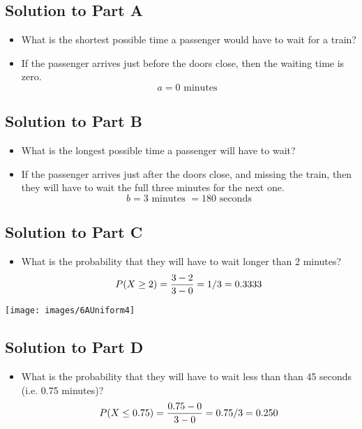 \documentclass[a4paper,12pt]{article}
\begin{document}
{
\subsection*{Solution to Part A}

\begin{itemize}
\item What is the shortest possible time a passenger would have to wait for a train?
\item If the passenger arrives just before the doors close, then the waiting time is zero.
\[ a = 0 \mbox{ minutes } \]
\end{itemize}
\subsection*{Solution to Part B}
\begin{itemize}
\item What is the longest possible time a passenger will have to wait?
\item If the passenger arrives just after the doors close, and missing the train, then they will have to wait the full three minutes for the next one.
\[ b = 3 \mbox{ minutes }  = 180 \mbox{ seconds}  \]
\end{itemize}
\subsection*{Solution to Part C}



\begin{itemize}
\item What is the probability that they will have to wait longer than 2 minutes?
\[ P(X \geq 2)  = {3-2 \over 3-0} = {1/3} = 0.3333   \]
\end{itemize}



\begin{center}
\texttt{[image: images/6AUniform4]}

\end{center}

\subsection*{Solution to Part D}

\begin{itemize}
\item What is the probability that they will have to wait less than than 45 seconds (i.e. 0.75 minutes)?
\[ P(X \leq 0.75)  = {0.75 - 0 \over 3-0} = {0.75/3} = 0.250  \]
\end{itemize}

}
\end{document}
